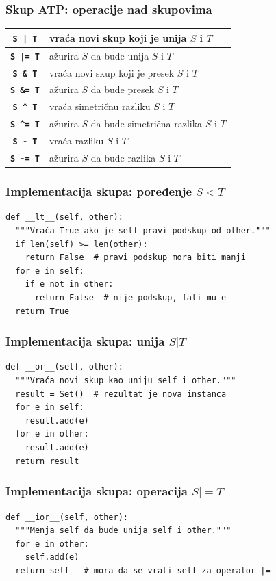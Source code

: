 \documentclass[compress,aspectratio=169]{beamer}
\begin{document}
\begin{frame}[fragile]
  \frametitle{Skup ATP: operacije nad skupovima}
  \begin{center}
    \begin{tabular}{cp{8.5cm}}
      \textbf{\texttt{S | T}} & vraća novi skup koji je unija $S$ i $T$ \\ \hline
      \textbf{\texttt{S |= T}} & ažurira $S$ da bude unija $S$ i $T$ \\ \hline
      \textbf{\texttt{S \& T}} & vraća novi skup koji je presek $S$ i $T$ \\ \hline
      \textbf{\texttt{S \&= T}} & ažurira $S$ da bude presek $S$ i $T$ \\ \hline
      \textbf{\texttt{S \^{} T}} & vraća simetričnu razliku $S$ i $T$ \\ \hline
      \textbf{\texttt{S \^{}= T}} & ažurira $S$ da bude simetrična razlika $S$ i $T$ \\ \hline
      \textbf{\texttt{S - T}} & vraća razliku $S$ i $T$ \\ \hline
      \textbf{\texttt{S -= T}} & ažurira $S$ da bude razlika $S$ i $T$ \\
    \end{tabular}
  \end{center}
\end{frame}

\begin{frame}
  \frametitle{Implementacija skupa: poređenje $S < T$}
\begin{verbatim}
def __lt__(self, other):
  """Vraća True ako je self pravi podskup od other."""
  if len(self) >= len(other):
    return False  # pravi podskup mora biti manji
  for e in self:
    if e not in other:
      return False  # nije podskup, fali mu e
  return True
  \end{verbatim}
\end{frame}

\begin{frame}
  \frametitle{Implementacija skupa: unija $S | T$}
\begin{verbatim}
def __or__(self, other):
  """Vraća novi skup kao uniju self i other."""
  result = Set()  # rezultat je nova instanca
  for e in self:
    result.add(e)
  for e in other:
    result.add(e)
  return result
\end{verbatim}
\end{frame}

\begin{frame}
  \frametitle{Implementacija skupa: operacija $S |= T$}
\begin{verbatim}
def __ior__(self, other):
  """Menja self da bude unija self i other."""
  for e in other:
    self.add(e)
  return self   # mora da se vrati self za operator |=
\end{verbatim}
\end{frame}
\end{document}
